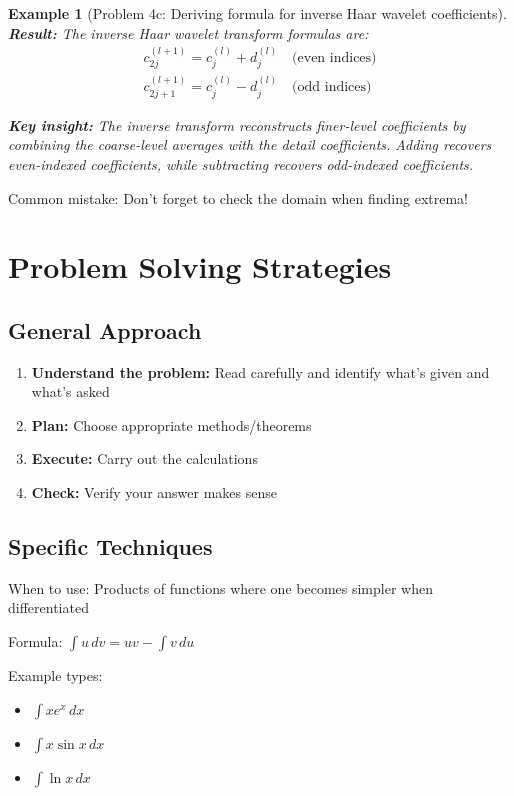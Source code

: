 \documentclass[11pt,a4paper]{article}
\newtheorem{example}[theorem]{Example}
\begin{document}
\begin{example}[Problem 4c: Deriving formula for inverse Haar wavelet coefficients]
\textbf{Result:} The inverse Haar wavelet transform formulas are:
\begin{align}
\boxed{c_{2j}^{(l+1)} = c_j^{(l)} + d_j^{(l)}} \quad \text{(even indices)}\\
\boxed{c_{2j+1}^{(l+1)} = c_j^{(l)} - d_j^{(l)}} \quad \text{(odd indices)}
\end{align}

\textbf{Key insight:} The inverse transform reconstructs finer-level coefficients by combining the coarse-level averages with the detail coefficients. Adding recovers even-indexed coefficients, while subtracting recovers odd-indexed coefficients.
\end{example}

\begin{warning}
    Common mistake: Don't forget to check the domain when finding extrema!
\end{warning}

\section{Problem Solving Strategies}

\subsection{General Approach}
\begin{enumerate}
    \item \textbf{Understand the problem:} Read carefully and identify what's given and what's asked
    \item \textbf{Plan:} Choose appropriate methods/theorems
    \item \textbf{Execute:} Carry out the calculations
    \item \textbf{Check:} Verify your answer makes sense
\end{enumerate}

\subsection{Specific Techniques}
\begin{reviewbox}
    When to use: Products of functions where one becomes simpler when differentiated
    
    Formula: $\int u\,dv = uv - \int v\,du$
    
    Example types:
    \begin{itemize}
        \item $\int x e^x\,dx$
        \item $\int x \sin x\,dx$
        \item $\int \ln x\,dx$
    \end{itemize}
\end{reviewbox}
\end{document}
